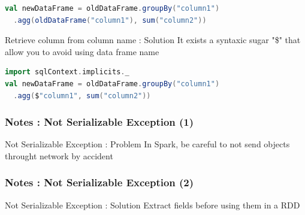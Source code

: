 \documentclass[slidetop,9pt,utf8]{beamer}
\begin{document}
\begin{CJK}{UTF8}{gbsn}
\begin{frame}[fragile]
  \begin{lstlisting}[label=columnNameProblem, caption=Use the name of the data frame containing the column to retrieve column, language=scala, style=code]
val newDataFrame = oldDataFrame.groupBy("column1")
  .agg(oldDataFrame("column1"), sum("column2"))
  \end{lstlisting}

  \begin{exampleblock}{Retrieve column from column name : Solution}
    It exists a syntaxic sugar "\$" that allow you to avoid using data frame name
  \end{exampleblock}

  \begin{lstlisting}[label=changeNameSelectedColumn, caption=Use "\$" and retrieve directly column from column name, language=scala, style=code]
import sqlContext.implicits._
val newDataFrame = oldDataFrame.groupBy("column1")
  .agg($"column1", sum("column2"))
  \end{lstlisting}

\end{frame}

\begin{frame}[fragile]
  \frametitle{Notes : Not Serializable Exception (1)}

  \begin{exampleblock}{Not Serializable Exception : Problem}
    In Spark, be careful to not send objects throught network by accident
  \end{exampleblock}

  

\end{frame}

\begin{frame}[fragile]
  \frametitle{Notes : Not Serializable Exception (2)}

  \begin{exampleblock}{Not Serializable Exception : Solution}
    Extract fields before using them in a RDD
  \end{exampleblock}

  


\end{frame}
\end{CJK}
\end{document}
